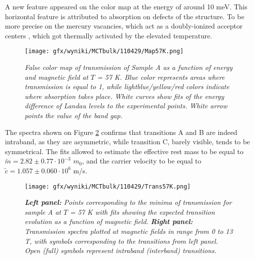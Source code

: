 \documentclass[titlepage,a4paper]{book}
\begin{document}
A new feature appeared on the color map at the energy of around 10 meV. This horizontal feature is attributed to absorption on defects of the structure. To be more precise on the mercury vacancies, which act as a doubly-ionized acceptor centers \cite{Kozlov_MCT_bulk}, which got thermally activated by the elevated temperature.

\begin{figure}[ht]
	\centering
	\texttt{[image: gfx/wyniki/MCTbulk/110429/Map57K.png]}
	\vspace{-10pt}
	\caption{\textit{False color map of transmission of Sample A as a function of energy and magnetic field at $T$ = 57 K. Blue color represents areas where transmission is equal to 1, while lightblue/yellow/red colors indicate where absorption takes place. White curves show fits of the energy difference of Landau levels to the experimental points. White arrow points the value of the band gap.}}
	\label{fig:Map_110429_57K}
\end{figure} 

The spectra shown on Figure \ref{fig:Spectra_110429_57K} confirms that transitions A and B are indeed intraband, as they are asymmetric, while transition C, barely visible, tends to be symmetrical. The fits allowed to estimate the effective rest mass to be equal to $\tilde m = 2.82 \pm 0.77 \cdot 10^{-3}$ $m_0$, and the carrier velocity to be equal to $\tilde{c} = 1.057 \pm 0.060 \cdot 10^6$ m/s. 

\begin{figure}[H]
	\centering
	\texttt{[image: gfx/wyniki/MCTbulk/110429/Trans57K.png]}
	\vspace{-10pt}
	\caption{\textit{\textbf{Left panel:} Points corresponding to the minima of transmission for sample A at $T$ = 57 K with fits showing the expected transition evolution as a function of magnetic field. \textbf{Right panel:} Transmission spectra plotted at magnetic fields in range from 0 to 13 T, with symbols corresponding to the transitions from left panel. Open (full) symbols represent intraband (interband) transitions.}}
	\label{fig:Spectra_110429_57K}
\end{figure}  
\end{document}
